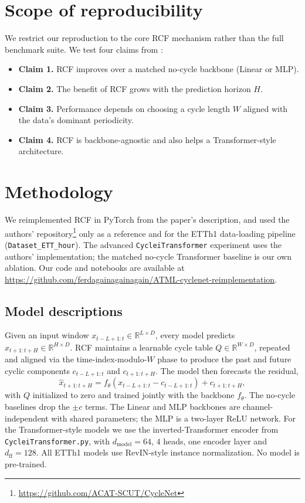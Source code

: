 \documentclass[10pt]{article}
\begin{document}
\section{Scope of reproducibility}
\label{sec:claims}

We restrict our reproduction to the core RCF mechanism rather than the full benchmark suite. We test four claims from \citet{lin2024cyclenet}:

\begin{itemize}
    \item \textbf{Claim 1.} RCF improves over a matched no-cycle backbone (Linear or MLP).
    \item \textbf{Claim 2.} The benefit of RCF grows with the prediction horizon $H$.
    \item \textbf{Claim 3.} Performance depends on choosing a cycle length $W$ aligned with the data's dominant periodicity.
    \item \textbf{Claim 4.} RCF is backbone-agnostic and also helps a Transformer-style architecture.
\end{itemize}

\section{Methodology}

We reimplemented RCF in PyTorch from the paper's description, and used the authors' repository\footnote{\url{https://github.com/ACAT-SCUT/CycleNet}} only as a reference and for the ETTh1 data-loading pipeline (\texttt{Dataset\_ETT\_hour}). The advanced \texttt{CycleiTransformer} experiment uses the authors' implementation; the matched no-cycle Transformer baseline is our own ablation. Our code and notebooks are available at \url{https://github.com/ferdagainagainagain/ATML-cyclenet-reimplementation}.

\subsection{Model descriptions}

Given an input window $x_{t-L+1:t} \in \mathbb{R}^{L \times D}$, every model predicts $\hat{x}_{t+1:t+H} \in \mathbb{R}^{H \times D}$. RCF maintains a learnable cycle table $Q \in \mathbb{R}^{W \times D}$, repeated and aligned via the time-index-modulo-$W$ phase to produce the past and future cyclic components $c_{t-L+1:t}$ and $c_{t+1:t+H}$. The model then forecasts the residual,
\[
\hat{x}_{t+1:t+H} = f_\theta(x_{t-L+1:t} - c_{t-L+1:t}) + c_{t+1:t+H},
\]
with $Q$ initialized to zero and trained jointly with the backbone $f_\theta$. The no-cycle baselines drop the $\pm c$ terms. The Linear and MLP backbones are channel-independent with shared parameters; the MLP is a two-layer ReLU network. For the Transformer-style models we use the inverted-Transformer encoder from \texttt{CycleiTransformer.py}, with $d_\mathrm{model}{=}64$, $4$ heads, one encoder layer and $d_\mathrm{ff}{=}128$. All ETTh1 models use RevIN-style instance normalization. No model is pre-trained.
\end{document}
